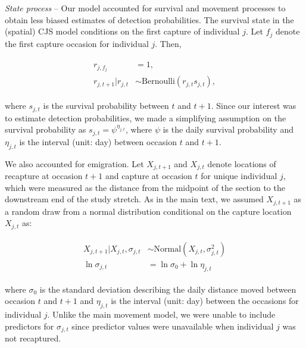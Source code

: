 \documentclass[11pt, class=article, crop=false]{standalone}
\begin{document}


\textit{State process} -- 
Our model accounted for survival and movement processes to obtain less biased estimates of detection probabilities.
The survival state in the (spatial) CJS model conditions on the first capture of individual $j$.
Let $f_{j}$ denote the first capture occasion for individual $j$.
Then,

\begin{align}
    \begin{split}
        r_{j, f_j} &= 1,\\
    r_{j, t + 1} | r_{j, t} &\sim \text{Bernoulli}(r_{j,t} s_{j,t}),    
    \end{split}
\end{align}

where $s_{j,t}$ is the survival probability between $t$ and $t + 1$.
Since our interest was to estimate detection probabilities, we made a simplifying assumption on the survival probability as $s_{j, t} = \psi^{\eta_{j,t}}$, where $\psi$ is the daily survival probability and $\eta_{j,t}$ is the interval (unit: day) between occasion $t$ and $t + 1$.

We also accounted for emigration.
Let $X_{j, t+1}$ and $X_{j, t}$ denote locations of recapture at occasion $t+1$ and capture at occasion $t$ for unique individual $j$, which were measured as the distance from the midpoint of the section to the downstream end of the study stretch.
As in the main text, we assumed $X_{j,t+1}$ as a random draw from a normal distribution conditional on the capture location $X_{j,t}$ as:

\begin{align}
    \begin{split}
        X_{j, t+1}|X_{j, t}, \sigma_{j, t} &\sim \text{Normal}(X_{j, t}, \sigma_{j, t}^2)\\
        \ln \sigma_{j, t} &= \ln \sigma_0 + \ln \eta_{j, t}
    \end{split}
    \label{eq:si-normal}
\end{align}

where $\sigma_0$ is the standard deviation describing the daily distance moved between occasion $t$ and $t+1$ and $\eta_{j,t}$ is the interval (unit: day) between the occasions for individual $j$.
Unlike the main movement model, we were unable to include predictors for $\sigma_{j,t}$ since predictor values were unavailable when individual $j$ was not recaptured.
\end{document}
